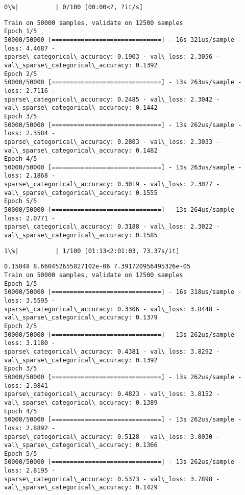 \documentclass[11pt]{article}
\begin{document}
    \begin{Verbatim}[commandchars=\\\{\}]
  0\%|          | 0/100 [00:00<?, ?it/s]
    \end{Verbatim}

    \begin{Verbatim}[commandchars=\\\{\}]
Train on 50000 samples, validate on 12500 samples
Epoch 1/5
50000/50000 [==============================] - 16s 321us/sample - loss: 4.4687 -
sparse\_categorical\_accuracy: 0.1903 - val\_loss: 2.3056 -
val\_sparse\_categorical\_accuracy: 0.1392
Epoch 2/5
50000/50000 [==============================] - 13s 263us/sample - loss: 2.7116 -
sparse\_categorical\_accuracy: 0.2485 - val\_loss: 2.3042 -
val\_sparse\_categorical\_accuracy: 0.1442
Epoch 3/5
50000/50000 [==============================] - 13s 262us/sample - loss: 2.3584 -
sparse\_categorical\_accuracy: 0.2803 - val\_loss: 2.3033 -
val\_sparse\_categorical\_accuracy: 0.1482
Epoch 4/5
50000/50000 [==============================] - 13s 263us/sample - loss: 2.1868 -
sparse\_categorical\_accuracy: 0.3019 - val\_loss: 2.3027 -
val\_sparse\_categorical\_accuracy: 0.1555
Epoch 5/5
50000/50000 [==============================] - 13s 264us/sample - loss: 2.0771 -
sparse\_categorical\_accuracy: 0.3188 - val\_loss: 2.3022 -
val\_sparse\_categorical\_accuracy: 0.1585
    \end{Verbatim}

    \begin{Verbatim}[commandchars=\\\{\}]
  1\%|          | 1/100 [01:13<2:01:03, 73.37s/it]
    \end{Verbatim}

    \begin{Verbatim}[commandchars=\\\{\}]
0.15848 8.660452655827102e-06 7.391720956495326e-05
Train on 50000 samples, validate on 12500 samples
Epoch 1/5
50000/50000 [==============================] - 16s 318us/sample - loss: 3.5595 -
sparse\_categorical\_accuracy: 0.3306 - val\_loss: 3.8448 -
val\_sparse\_categorical\_accuracy: 0.1379
Epoch 2/5
50000/50000 [==============================] - 13s 262us/sample - loss: 3.1180 -
sparse\_categorical\_accuracy: 0.4381 - val\_loss: 3.8292 -
val\_sparse\_categorical\_accuracy: 0.1392
Epoch 3/5
50000/50000 [==============================] - 13s 262us/sample - loss: 2.9841 -
sparse\_categorical\_accuracy: 0.4823 - val\_loss: 3.8152 -
val\_sparse\_categorical\_accuracy: 0.1389
Epoch 4/5
50000/50000 [==============================] - 13s 262us/sample - loss: 2.8892 -
sparse\_categorical\_accuracy: 0.5128 - val\_loss: 3.8030 -
val\_sparse\_categorical\_accuracy: 0.1366
Epoch 5/5
50000/50000 [==============================] - 13s 262us/sample - loss: 2.8195 -
sparse\_categorical\_accuracy: 0.5373 - val\_loss: 3.7898 -
val\_sparse\_categorical\_accuracy: 0.1429
    \end{Verbatim}
\end{document}
